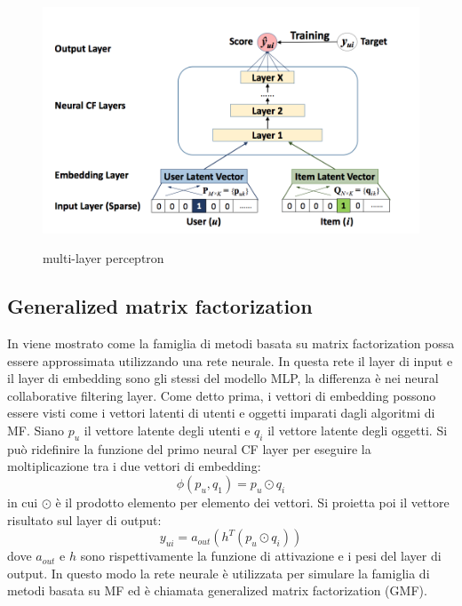 \begin{figure}
  \centering
  \includegraphics[width=\linewidth]{immagini/ncf.png}
  \caption{multi-layer perceptron}
  \cite{NCF}
  \label{fig:ncf}
\end{figure}

\subsection{Generalized matrix factorization}
In \cite{NCF} viene mostrato come la famiglia di metodi basata su matrix factorization possa essere approssimata utilizzando una rete neurale. In questa rete il layer di input e il layer di embedding sono gli stessi del modello MLP, la differenza è nei neural collaborative filtering layer. Come detto prima, i vettori di embedding possono essere visti come i vettori latenti di utenti e oggetti imparati dagli algoritmi di MF. Siano $p_u$ il vettore latente degli utenti e $q_i$ il vettore latente degli oggetti. Si può ridefinire la funzione del primo neural CF layer per eseguire la moltiplicazione tra i due vettori di embedding:
$$
\phi(p_u, q_1) = p_u \odot q_i
$$
in cui $\odot$ è il prodotto elemento per elemento dei vettori. Si proietta poi il vettore risultato sul layer di output:
$$
y_{ui} = a_{out}(h^T(p_u \odot q_i))
$$
dove $a_{out}$ e $h$ sono rispettivamente la funzione di attivazione e  i pesi del layer di output. In questo modo la rete neurale è utilizzata per simulare la famiglia di metodi basata su MF ed è chiamata generalized matrix factorization (GMF).

